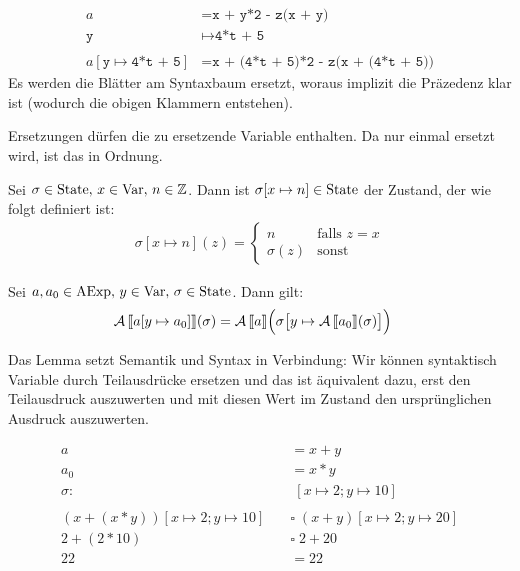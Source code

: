 \begin{example}
    \begin{align*}
        a & = \texttt{x + y*2 - z(x + y)} \\
        \texttt{y} & \mapsto \texttt{4*t + 5} \\
        \\
        a[\texttt{y} \mapsto \texttt{4*t + 5}] & = \texttt{x + (4*t + 5)*2 - z(x + (4*t + 5))}
    \end{align*}
    Es werden die Blätter am Syntaxbaum ersetzt, woraus implizit die Präzedenz klar ist (wodurch die obigen Klammern entstehen).

    Ersetzungen dürfen die zu ersetzende Variable enthalten. Da nur einmal ersetzt wird, ist das in Ordnung.
\end{example}

\begin{definition}\label{def:substitutionState}
    Sei $\sigma \in \operatorname{State}, \, x \in \operatorname{Var}, \, n \in \mathbb{Z}$. Dann ist $\sigma[x \mapsto n] \in \operatorname{State}$ der Zustand, der wie folgt definiert ist:
    \begin{align*}
        \sigma[x \mapsto n](z) = \begin{cases}
            n & \text{falls } z = x \\
            \sigma(z) & \text{sonst}
        \end{cases}
    \end{align*}
\end{definition}

\begin{lemma}
    Sei $a, a_0 \in \operatorname{AExp}, \, y \in \operatorname{Var}, \, \sigma \in \operatorname{State}$. Dann gilt:
    \begin{align*}
        \operatorname{\mathcal{A}}\mathrm{[}\kern-.14em\mathrm{[} a[y \mapsto a_0] \mathrm{]}\kern-.14em\mathrm{]}(\sigma) & = \operatorname{\mathcal{A}}\mathrm{[}\kern-.14em\mathrm{[} a \mathrm{]}\kern-.14em\mathrm{]} \Big( \sigma\big[y \mapsto \operatorname{\mathcal{A}}\mathrm{[}\kern-.14em\mathrm{[} a_0 \mathrm{]}\kern-.14em\mathrm{]}(\sigma)\big] \Big)
    \end{align*}
\end{lemma}

Das Lemma setzt Semantik und Syntax in Verbindung: Wir können syntaktisch Variable durch Teilausdrücke ersetzen und das ist äquivalent dazu, erst den Teilausdruck auszuwerten und mit diesen Wert im Zustand den ursprünglichen Ausdruck auszuwerten.

\begin{example}
    \begin{align*}
    a & = x + y \\
    a_0 & = x * y \\
    \sigma: & \; [x \mapsto 2; y \mapsto 10] \\
    \\
    (x + (x * y))[x \mapsto 2; y \mapsto 10] \quad & \square\; (x + y)[x \mapsto 2; y \mapsto 20] \\
    2 + (2 * 10) \quad & \square\; 2 + 20 \\
    22 \quad & = 22
\end{align*}
\end{example}


